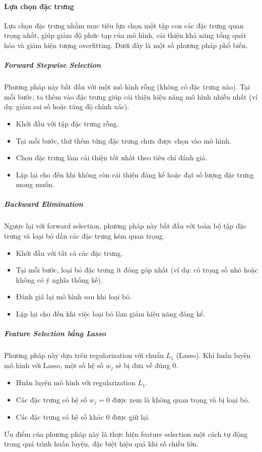 \paragraph{Lựa chọn đặc trưng}

Lựa chọn đặc trưng nhằm mục tiêu lựa chọn một tập con các đặc trưng quan trọng
nhất, giúp giảm độ phức tạp của mô hình, cải thiện khả năng tổng quát hóa và
giảm hiện tượng overfitting. Dưới đây là một số phương pháp phổ biến.

\subparagraph{Forward Stepwise Selection}
Phương pháp này bắt đầu với một mô hình rỗng (không có đặc trưng nào). Tại mỗi
bước, ta thêm vào đặc trưng giúp cải thiện hiệu năng mô hình nhiều nhất (ví
dụ: giảm sai số hoặc tăng độ chính xác).
\begin{itemize}
    \item Khởi đầu với tập đặc trưng rỗng.
    \item Tại mỗi bước, thử thêm từng đặc trưng chưa được chọn vào mô hình.
    \item Chọn đặc trưng làm cải thiện tốt nhất theo tiêu chí đánh giá.
    \item Lặp lại cho đến khi không còn cải thiện đáng kể hoặc đạt số lượng
    đặc trưng mong muốn.
\end{itemize}

\subparagraph{Backward Elimination}
Ngược lại với forward selection, phương pháp này bắt đầu với toàn bộ tập đặc
trưng và loại bỏ dần các đặc trưng kém quan trọng.
\begin{itemize}
    \item Khởi đầu với tất cả các đặc trưng.
    \item Tại mỗi bước, loại bỏ đặc trưng ít đóng góp nhất (ví dụ: có trọng số
    nhỏ hoặc không có ý nghĩa thống kê).
    \item Đánh giá lại mô hình sau khi loại bỏ.
    \item Lặp lại cho đến khi việc loại bỏ làm giảm hiệu năng đáng kể.
\end{itemize}

\subparagraph{Feature Selection bằng Lasso}
Phương pháp này dựa trên regularization với chuẩn $L_1$ (Lasso). Khi huấn
luyện mô hình với Lasso, một số hệ số $w_j$ sẽ bị đưa về đúng $0$.
\begin{itemize}
    \item Huấn luyện mô hình với regularization $L_1$.
    \item Các đặc trưng có hệ số $w_j = 0$ được xem là không quan trọng và bị
    loại bỏ.
    \item Các đặc trưng có hệ số khác $0$ được giữ lại.
\end{itemize}

Ưu điểm của phương pháp này là thực hiện feature selection một cách tự động
trong quá trình huấn luyện, đặc biệt hiệu quả khi số chiều lớn.
